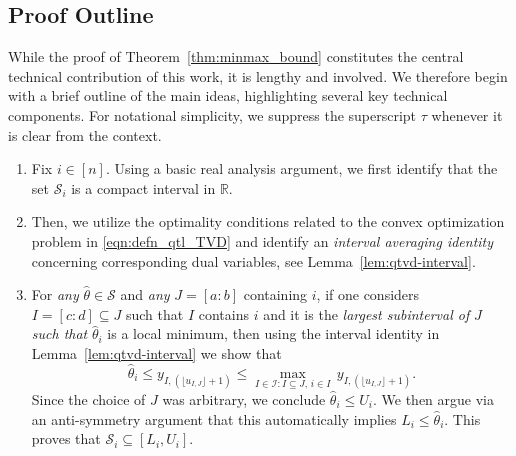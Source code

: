 \documentclass[11pt]{article}
\newcommand{\I}{\mathcal{I}}
\newcommand{\cS}{\mathcal{S}}
\newcommand{\bR}{\mathbb{R}}
\theoremstyle{plain}
\theoremstyle{definition}
\theoremstyle{remark}
\begin{document}
\subsection{Proof Outline}
While the proof of Theorem~\ref{thm:minmax_bound} constitutes the central technical contribution of this work, it is lengthy and involved. We therefore begin with a brief outline of the main ideas, highlighting several key technical components. For notational simplicity, we suppress the superscript $\tau$ whenever it is clear from the context.
\begin{enumerate}
    \item Fix $i\in [n]$. Using a basic real analysis argument, we first identify that the set $\cS_i$ is a compact interval in $\bR$.
    \item Then, we utilize the optimality conditions related to the convex optimization problem in \eqref{eqn:defn_qtl_TVD} and identify an \textit{interval averaging identity} concerning corresponding dual variables, see Lemma~\ref{lem:qtvd-interval}.
    \item For \textit{any} $\hat{\theta}\in \cS$ and \textit{any} $J = [a:b]$ containing $i$, if one considers $I=[c:d]\subseteq J$ such that $I$ contains $i$ and it is the \textit{largest subinterval of }$J$ \textit{such that } $\hat{\theta}_i$ is a local minimum, then using the interval identity in Lemma~\ref{lem:qtvd-interval} we show that
\[
\hat{\theta}_i\leq y_{I,(\lfloor u_{I,J}\rfloor+1)}\leq \max_{I\in \I: I\subseteq J,\, i \in I}\, y_{I,(\lfloor u_{I,J}\rfloor+1)}.
\]
Since the choice of $J$ was arbitrary, we conclude $\hat{\theta}_i\leq U_i$. We then argue via an anti-symmetry argument that this automatically implies $L_i\leq \hat{\theta}_i$. This proves that $\cS_i\subseteq [L_i,U_i].$


\end{enumerate}
\end{document}
